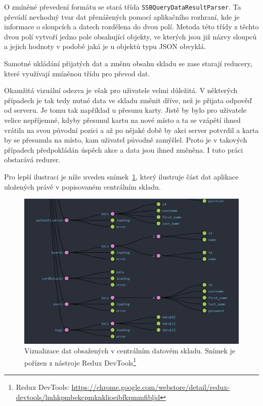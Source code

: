 O zmíněné převedení formátu se stará třída \texttt{SSBQueryDataResultParser}. Ta převádí nevhodný tvar dat přenášených pomocí aplikačního rozhraní, kde je informace o sloupcích a datech rozdělena do dvou polí. Metoda této třídy z těchto dvou polí vytvoří jedno pole obsahující objekty, ve kterých jsou již názvy sloupců a jejich hodnoty v podobě jaká je u objektů typu JSON obvyklá.

Samotné ukládání přijatých dat a změnu obsahu skladu se zase starají reducery, které využívají zmíněnou třídu pro převod dat. 

Okamžitá vizuální odezva je však pro uživatele velmi důležitá. V některých případech je tak tedy nutné data ve skladu změnit dříve, než je přijata odpověď od serveru. Je tomu tak například u přesunu karty. Jistě by bylo pro uživatele velice nepříjemné, kdyby přesunul kartu na nové místo a ta se vzápětí ihned vrátila na svou původní pozici a až po nějaké době by akci server potvrdil a karta by se přesunula na místo, kam uživatel původně zamýšlel. Proto je v takových případech předpokládán úspěch akce a data jsou ihned změněna. I tuto práci obstarává redurer.

Pro lepší ilustraci je níže uveden snímek~\ref{img:ngrx-devtools}, který ilustruje část dat aplikace uložených právě v popisovaném centrálním skladu.

\begin{figure}[H]
	\centering
	\label{img:ngrx-devtools}
	\includegraphics[width=\textwidth]{obrazky-figures/ngrx-chart.png}
	\caption{Vizualizace dat obsažených v centrálním datovém skladu. Snímek je pořízen z nástroje Redux DevTools\footnote{Redux DevTools: \url{https://chrome.google.com/webstore/detail/redux-devtools/lmhkpmbekcpmknklioeibfkpmmfibljd}}}
\end{figure}

